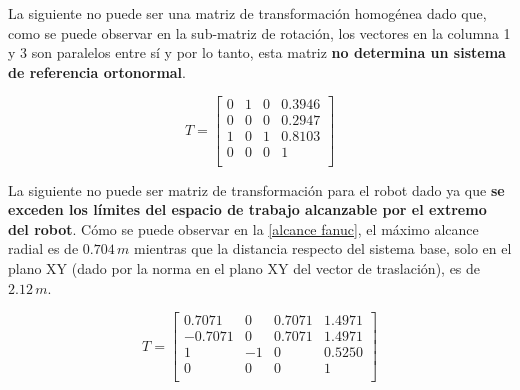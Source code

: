 \documentclass[a4paper,12pt]{article}
\begin{document}
La siguiente no puede ser una matriz de transformación homogénea dado que,
como se puede observar en la sub-matriz de rotación, los vectores en la columna 1 y 3 son paralelos entre sí 
y por lo tanto, esta matriz \textbf{no determina un sistema de referencia ortonormal}.

\begin{equation*}
    T = 
    \begin{bmatrix}
        0 & 1 & 0 & 0.3946\\
        0 & 0 & 0 & 0.2947\\
        1 & 0 & 1 & 0.8103\\
        0 & 0 & 0 & 1     \\
    \end{bmatrix}
\end{equation*}

La siguiente no puede ser matriz de transformación para el robot dado ya que \textbf{se exceden
los límites del espacio de trabajo alcanzable por el extremo del robot}. Cómo se puede observar en la
\cref{alcance fanuc}, el máximo alcance radial es de $0.704\,m$ mientras que la distancia respecto del sistema base,
solo en el plano XY (dado por la norma en el plano XY del vector de traslación), es de $2.12\,m$.

\begin{equation*}
    T = 
    \begin{bmatrix}
        0.7071  &  0  & 0.7071 & 1.4971\\
        -0.7071 &  0  & 0.7071 & 1.4971\\
        1       & -1  &    0   & 0.5250\\
        0       &  0  &    0   &    1  \\
    \end{bmatrix}
\end{equation*}
\end{document}
